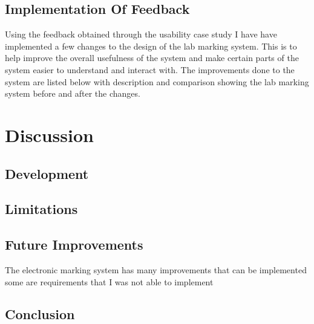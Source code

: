 \documentclass[12pt]{article}  %
\begin{document}
\subsection{Implementation Of Feedback}

Using the feedback obtained through the usability case study I have have implemented a few changes to the design of the lab marking system. This is to help improve the overall usefulness of the system and make certain parts of the system easier to understand and interact with. The improvements done to the system are listed below with description and comparison showing the lab marking system before and after the changes.   


\newpage
\section{Discussion}

\subsection{Development}

\subsection{Limitations}

\subsection{Future Improvements}
The electronic marking system has many improvements that can be implemented some are requirements that I was not able to implement 

\subsection{Conclusion}











\newpage
\printbibliography[heading=bibintoc]
\let\cleardoublepage\clearpage
\end{document}

